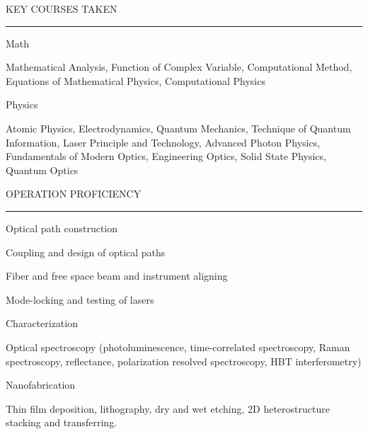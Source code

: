 \documentclass{resume} %
\renewenvironment{rSection}[1]{
\sectionskip
\textcolor{CarnegieMellonRed}{\MakeUppercase{#1}}
\sectionlineskip
\hrule
\begin{list}{}{
\setlength{\leftmargin}{1.5em}
}
\item[]
}{
\end{list}
}
\begin{document}
\begin{rSection}{Key courses taken} \itemsep -2pt
\begin{rSubsection}{Math}{}{}
\item Mathematical Analysis, Function of Complex Variable, Computational Method, Equations of Mathematical Physics, Computational Physics
\end{rSubsection}

\begin{rSubsection}{Physics}{}{}
\item Atomic Physics, Electrodynamics, Quantum Mechanics, Technique of Quantum Information, Laser Principle and Technology, Advanced Photon Physics, Fundamentals of Modern Optics, Engineering Optics, Solid State Physics, Quantum Optics
\end{rSubsection}

\end{rSection}

\begin{rSection}{OPERATION PROFICIENCY} \itemsep -2pt

\begin{rSubsection}{Optical path construction}{}{}

\item Coupling and design of optical paths

\item Fiber and free space beam and instrument aligning 
\item Mode-locking and testing of lasers

\end{rSubsection}

\begin{rSubsection}{Characterization}{}{}

\item Optical spectroscopy (photoluminescence, time-correlated spectroscopy, Raman spectroscopy, reflectance, polarization resolved spectroscopy, HBT interferometry)

\end{rSubsection}

\begin{rSubsection}{Nanofabrication}{}{}

\item Thin film deposition, lithography, dry and wet etching, 2D heterostructure stacking and transferring. 
\end{rSubsection}
	
\end{rSection}
\end{document}
